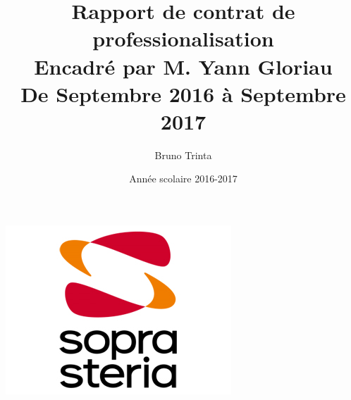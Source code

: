 \documentclass[12pt,a4paper]{article}
\title{Rapport de contrat de professionalisation \\ Encadré par M. Yann Gloriau \\ De Septembre 2016 à Septembre 2017}
\author{Bruno Trinta}
\date{Année scolaire 2016-2017}
\begin{document}
         
\begin{titlepage}
\thispagestyle{empty}
\maketitle{}
\begin{center}
\includegraphics[width=\textwidth,height=\textheight,keepaspectratio]{imagePageDeGarde.png}
\end{center}
\end{titlepage}
\end{document}
